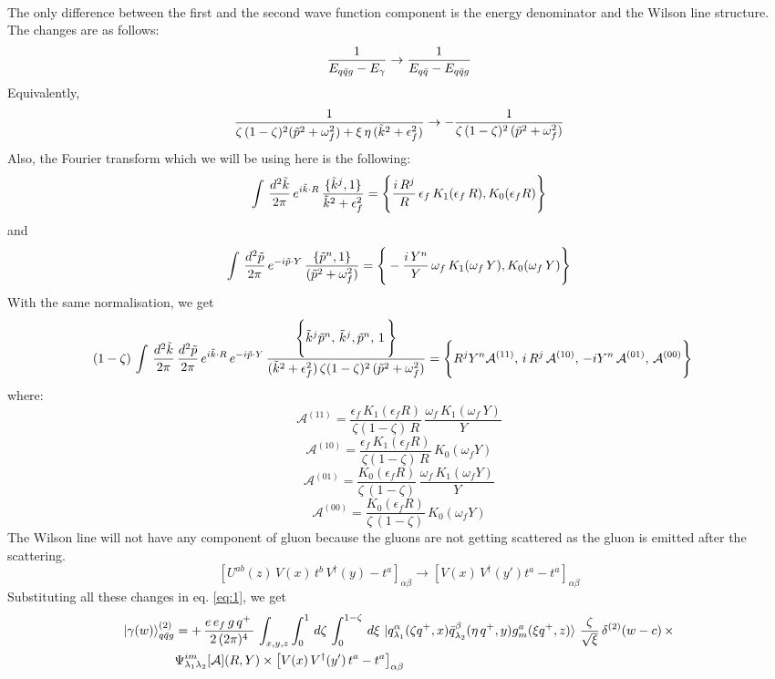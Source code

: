\documentclass[9pt]{article}
\numberwithin{equation}{section}
\begin{document}
\begin{enumerate}
\begin{align}
\end{align}
The only difference between the first and the second wave function component is the energy denominator and the Wilson line structure. The changes are as follows:
$$\frac{1}{E_{q\Bar{q}g}-E_{\gamma}}\rightarrow \frac{1}{E_{q\Bar{q}}-E_{q\Bar{q}g}}$$ 
Equivalently,
$$\frac{1}{\zeta\,(1-\zeta)^{2}(\Tilde{p}^{2}+\omega^{2}_{f})+\xi\,\eta\, (\Tilde{k}^{2}+\epsilon_{f}^{2})}\rightarrow -\frac{1}{\zeta\,(1-\zeta)^{2}\,(\Tilde{p}^{2}+\omega^{2}_{f})}$$
Also, the Fourier transform which we will be using here is the following:
$$\int\, \frac{d^{2}\Tilde{k}}{2\pi}\, e^{i\Tilde{k}\cdot R}\, \frac{\{\Tilde{k}^{j},1\}}{\Tilde{k}^{2}+\epsilon^{2}_{f}} = \Bigg\{\frac{i\,R^{j}}{R}\,\epsilon_{f}\,K_{1}(\epsilon_{f}\,R),K_{0}(\epsilon_{f} R)\Bigg\}$$
and $$\int\, \frac{d^{2}\Tilde{p}}{2\pi}\, e^{-i\Tilde{p}\cdot Y}\,\frac{\{\Tilde{p}^{n},1\}}{(\Tilde{p}^{2}+\omega^{2}_{f})} = \Bigg\{-\frac{i\,Y^{n}}{Y}\,\omega_{f}\,K_{1}(\omega_{f}\,Y),K_{0}(\omega_{f}\,Y)\Bigg\} $$
With the same normalisation, we get
\begin{align}
    (1-\zeta)\, \int\, \frac{d^{2}\Tilde{k}}{2\pi}\, \frac{d^{2}\Tilde{p}}{2\pi}\, e^{i\Tilde{k}\cdot R}\,e^{-i\Tilde{p}\cdot Y}\, \frac{\Bigg\{\Tilde{k}^{j}\Tilde{p}^{n},\,\Tilde{k}^{j},\Tilde{p}^{n},\,1\,\Bigg\}}{(\Tilde{k}^{2}+\epsilon^{2}_{f})\,\zeta(1-\zeta)^{2}\,(\Tilde{p}^{2} +\omega^{2}_{f})} & = \Bigg\{R^{j}Y^{n}\mathcal{A}^{(11)},\, i\,R^{j}\,\mathcal{A}^{(10)},\, -iY^{n}\,\mathcal{A}^{(01)},\, \mathcal{A}^{(00)}\Bigg\}
\end{align}
where: 
$$\mathcal{A}^{(11)} = \frac{\epsilon_{f}\,K_{1}(\epsilon_{f} R)}{\zeta(1-\zeta)\,R}\,\frac{\omega_{f}\,K_{1}(\omega_{f}\,Y)}{Y}$$
$$\mathcal{A}^{(10)} = \frac{\epsilon_{f}\,K_{1}(\epsilon_{f}R)}{\zeta(1-\zeta)\,R}\, K_{0}(\omega_{f}Y)$$
$$\mathcal{A}^{(01)} = \frac{K_{0}(\epsilon_{f}R)}{\zeta\,(1-\zeta)}\,\frac{\omega_{f}\,K_{1}(\omega_{f}Y)}{Y}$$
$$\mathcal{A}^{(00)} = \frac{K_{0}(\epsilon_{f}R)}{\zeta\,(1-\zeta)}\,K_{0}(\omega_{f}Y)$$
The Wilson line will not have any component of gluon because the gluons are not getting scattered as the gluon is emitted after the scattering. 
$$\left[U^{ab}(z)\,V(x)\,t^{b}\,V^{\dagger}(y)-t^{a}\right]_{\alpha\beta}\rightarrow \left[V(x)\,V^{\dagger}(y')t^{a}-t^{a}\right]_{\alpha\beta} $$
Substituting all these changes in eq. \eqref{eq:1}, we get
\begin{align} \label{eq:2}
     \ket{\gamma(w)}^{(2)}_{q\Bar{q}g} & = +\,\frac{e\,e_{f}\,g\,q^{+}\,}{2\,(2\pi)^{4}}\, \int_{x,y,z} \int_{0}^{1}\, d\zeta\, \int_{0}^{1-\zeta}\, d\xi\,\ket{q^{\alpha}_{\lambda_{1}}(\zeta q^{+},x)\Bar{q}^{\beta}_{\lambda_{2}}(\eta\,q^{+},y)g^{a}_{m}(\xi q^{+},z)}\, \frac{\zeta}{\sqrt{\xi}}\, \delta^{(2)}(w-c)\,\times \notag \\ & \Psi^{im}_{\lambda_{1}\lambda_{2}}[\mathcal{A}](R,Y)\times \left[V(x)\,V^{\dagger}(y')\,t^{a}-t^{a}\right]_{\alpha\beta}

\end{align}
\end{enumerate}
\end{document}
